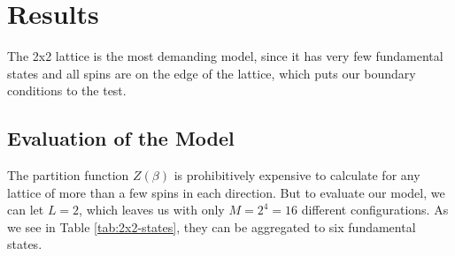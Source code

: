 \documentclass[]{article}
\begin{document}





\clearpage
\section{Results} \label{sec:results}

The 2x2 lattice is the most demanding model, since it has very few fundamental states and all spins are on the edge of the lattice, which puts our boundary conditions to the test.



\subsection{Evaluation of the Model} \label{sec:eval-model}

The partition function $Z(\beta)$ is prohibitively expensive to calculate for any lattice of more than a few spins in each direction. But to evaluate our model, we can let $L=2$, which leaves us with only $M = 2^4 = 16$ different configurations. As we see in Table \ref{tab:2x2-states}, they can be aggregated to six fundamental states.
\end{document}
